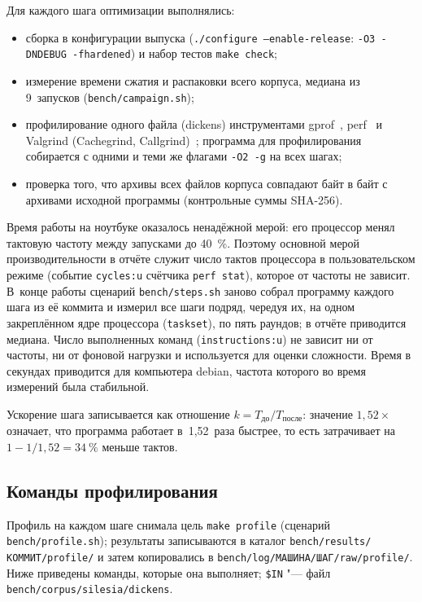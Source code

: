 Для каждого шага оптимизации выполнялись:
\begin{itemize}
\item сборка в конфигурации выпуска (\texttt{./configure --enable-release}:
\texttt{-O3 -DNDEBUG -fhardened}) и набор тестов \texttt{make check};
\item измерение времени сжатия и распаковки всего корпуса, медиана из
9~запусков (\texttt{bench/campaign.sh});
\item профилирование одного файла (dickens) инструментами gprof~\cite{gprof},
perf~\cite{perf} и Valgrind (Cachegrind, Callgrind)~\cite{valgrind};
программа для профилирования собирается с одними и теми же флагами
\texttt{-O2 -g} на всех шагах;
\item проверка того, что архивы всех файлов корпуса совпадают байт в байт с
архивами исходной программы (контрольные суммы SHA-256).
\end{itemize}

Время работы на ноутбуке оказалось ненадёжной мерой: его процессор менял
тактовую частоту между запусками до 40~\%. Поэтому основной мерой
производительности в отчёте служит число тактов процессора в
пользовательском режиме (событие \texttt{cycles:u} счётчика
\texttt{perf~stat}), которое от частоты не зависит. В~конце работы
сценарий \texttt{bench/steps.sh} заново собрал программу каждого шага из
её коммита и измерил все шаги подряд, чередуя их, на одном закреплённом
ядре процессора (\texttt{taskset}), по пять раундов; в отчёте приводится
медиана. Число выполненных команд (\texttt{instructions:u}) не зависит ни
от частоты, ни от фоновой нагрузки и используется для оценки сложности.
Время в секундах приводится для компьютера debian, частота которого во
время измерений была стабильной.

Ускорение шага записывается как отношение $k = T_{\text{до}} /
T_{\text{после}}$: значение $1{,}52\times$ означает, что программа работает
в~1,52~раза быстрее, то есть затрачивает на $1 - 1/1{,}52 = 34~\%$ меньше
тактов.

\subsection{Команды профилирования}

Профиль на каждом шаге снимала цель \texttt{make profile} (сценарий
\texttt{bench/profile.sh}); результаты записываются в каталог
\texttt{bench/results/КОММИТ/profile/} и затем копировались в
\texttt{bench/log/МАШИНА/ШАГ/raw/profile/}. Ниже приведены команды, которые
она выполняет; \texttt{\$IN} "--- файл \texttt{bench/corpus/silesia/dickens}.

